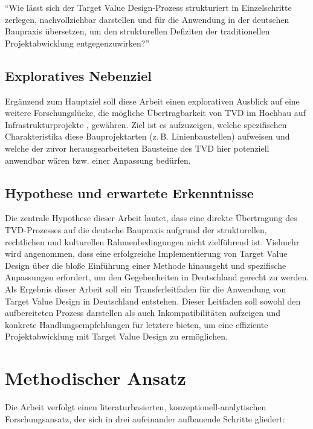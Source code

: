\enquote{Wie lässt sich der Target Value Design-Prozess strukturiert in Einzelschritte zerlegen, nachvollziehbar darstellen und für die Anwendung in der deutschen Baupraxis übersetzen, um den strukturellen Defiziten der traditionellen Projektabwicklung entgegenzuwirken?}

\subsection*{Exploratives Nebenziel}
Ergänzend zum Hauptziel soll diese Arbeit einen explorativen Ausblick auf eine weitere Forschungslücke, die mögliche Übertragbarkeit von TVD im Hochbau auf Infrastrukturprojekte \autocite [S.45]{ballard2025}, gewähren. Ziel ist es aufzuzeigen, welche spezifischen Charakteristika diese Bauprojektarten (z.\,B. Linienbaustellen) aufweisen und welche der zuvor herausgearbeiteten Bausteine des TVD hier potenziell anwendbar wären bzw. einer Anpassung bedürfen.

\subsection*{Hypothese und erwartete Erkenntnisse}
Die zentrale Hypothese dieser Arbeit lautet, dass eine direkte Übertragung des TVD-Prozesses auf die deutsche Baupraxis aufgrund der strukturellen, rechtlichen und kulturellen Rahmenbedingungen nicht zielführend ist. Vielmehr wird angenommen, dass eine erfolgreiche Implementierung von Target Value Design über die bloße Einführung einer Methode hinausgeht und spezifische Anpassungen erfordert, um den Gegebenheiten in Deutschland gerecht zu werden.
Als Ergebnis dieser Arbeit soll ein Transferleitfaden für die Anwendung von Target Value Design in Deutschland entstehen. Dieser Leitfaden soll sowohl den aufbereiteten Prozess darstellen als auch Inkompatibilitäten aufzeigen und konkrete Handlungsempfehlungen für letztere bieten, um eine effiziente Projektabwicklung mit Target Value Design zu ermöglichen.

\section*{Methodischer Ansatz}
\label{sec:methodischer-ansatz}

Die Arbeit verfolgt einen literaturbasierten, konzeptionell-analytischen Forschungsansatz, der sich in drei aufeinander aufbauende Schritte gliedert:

